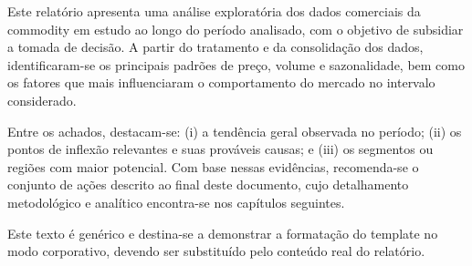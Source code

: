 %

Este relatório apresenta uma análise exploratória dos dados comerciais da
commodity em estudo ao longo do período analisado, com o objetivo de subsidiar
a tomada de decisão. A partir do tratamento e da consolidação dos dados,
identificaram-se os principais padrões de preço, volume e sazonalidade, bem
como os fatores que mais influenciaram o comportamento do mercado no intervalo
considerado.

Entre os achados, destacam-se: (i) a tendência geral observada no período;
(ii) os pontos de inflexão relevantes e suas prováveis causas; e (iii) os
segmentos ou regiões com maior potencial. Com base nessas evidências,
recomenda-se o conjunto de ações descrito ao final deste documento, cujo
detalhamento metodológico e analítico encontra-se nos capítulos seguintes.

Este texto é genérico e destina-se a demonstrar a formatação do template no
modo corporativo, devendo ser substituído pelo conteúdo real do relatório.


